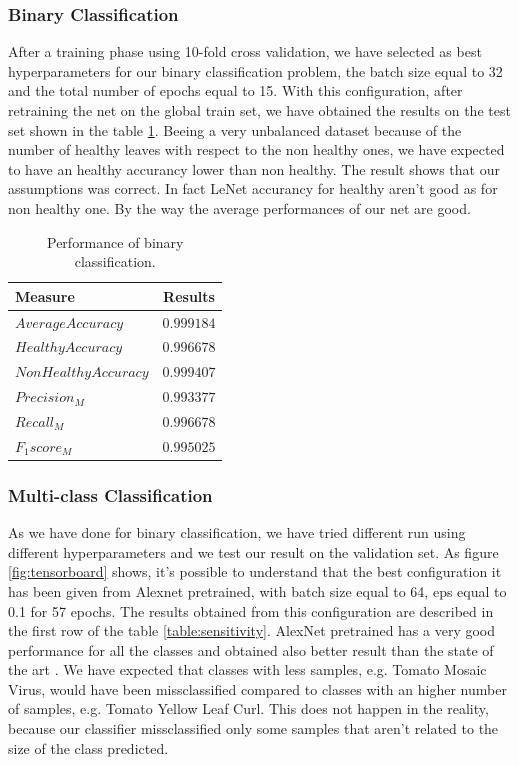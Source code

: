 \subsubsection{Binary Classification}
After a training phase using 10-fold cross validation, we have selected as best hyperparameters for our binary classification problem, the batch size equal to 32 and the total number of epochs equal to 15. With this configuration, after retraining the net on the global train set, we have obtained the results on the test set shown in the table \ref{table:binary}. Beeing a very unbalanced dataset because of the number of healthy leaves with respect to the non healthy ones, we have expected to have an healthy accurancy lower than non healthy. The result shows that our assumptions was correct. In fact LeNet accurancy for healthy aren't good as for non healthy one. By the way the average performances of our net are good.
\begin{table}[H]
	\begin{center}
		\begin{tabular}{|l|c|}
			\hline
			\textbf{Measure} & \textbf{Results} \\ 
			\hline
			$Average Accuracy$ & $0.999184$ \\
			$Healthy Accuracy$ & $0.996678$ \\
			$Non Healthy Accuracy$ & $0.999407$ \\
			$Precision_M$ & $0.993377$ \\
			$Recall_M$ & $0.996678$ \\
			$F_1 score_M$ & $0.995025$ \\
			\hline
		\end{tabular}
	\end{center}
	\caption{Performance of binary classification.}
	\label{table:binary}
\end{table}
\subsubsection{Multi-class Classification}
As we have done for binary classification, we have tried different run using different hyperparameters and we test our result on the validation set. As figure \ref{fig:tensorboard} shows, it's possible to understand that the best configuration it has been given from Alexnet pretrained, with batch size equal to 64, eps equal to 0.1 for 57 epochs. The results obtained from this configuration are described in the first row of the table \ref{table:sensitivity}. AlexNet pretrained has a very good performance for all the classes and obtained also better result than the state of the art \cite{ref11}. We have expected that classes with less samples, e.g. Tomato Mosaic Virus, would have been missclassified compared to classes with an higher number of samples, e.g. Tomato Yellow Leaf Curl. This does not happen in the reality, because our classifier missclassified only some samples that aren't related to the size of the class predicted.
